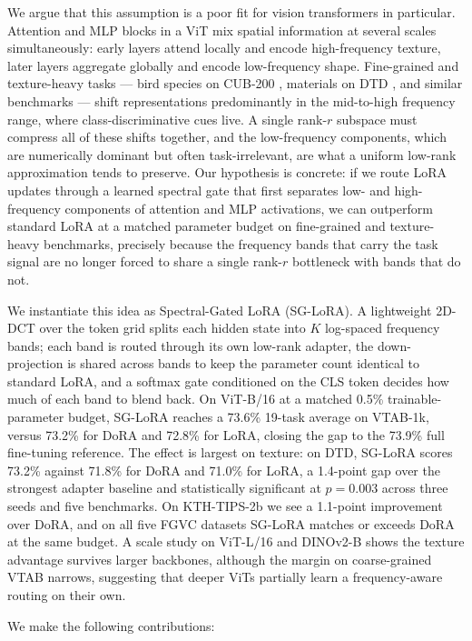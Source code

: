 \documentclass{article}
\begin{document}
We argue that this assumption is a poor fit for vision transformers in particular. Attention and MLP blocks in a ViT mix spatial information at several scales simultaneously: early layers attend locally and encode high-frequency texture, later layers aggregate globally and encode low-frequency shape. Fine-grained and texture-heavy tasks — bird species on CUB-200 \citep{wah2011cub}, materials on DTD \citep{cimpoi2014dtd}, and similar benchmarks — shift representations predominantly in the mid-to-high frequency range, where class-discriminative cues live. A single rank-$r$ subspace must compress all of these shifts together, and the low-frequency components, which are numerically dominant but often task-irrelevant, are what a uniform low-rank approximation tends to preserve. Our hypothesis is concrete: if we route LoRA updates through a learned spectral gate that first separates low- and high-frequency components of attention and MLP activations, we can outperform standard LoRA at a matched parameter budget on fine-grained and texture-heavy benchmarks, precisely because the frequency bands that carry the task signal are no longer forced to share a single rank-$r$ bottleneck with bands that do not.

We instantiate this idea as Spectral-Gated LoRA (SG-LoRA). A lightweight 2D-DCT over the token grid splits each hidden state into $K$ log-spaced frequency bands; each band is routed through its own low-rank adapter, the down-projection is shared across bands to keep the parameter count identical to standard LoRA, and a softmax gate conditioned on the CLS token decides how much of each band to blend back. On ViT-B/16 at a matched 0.5\% trainable-parameter budget, SG-LoRA reaches a 73.6\% 19-task average on VTAB-1k, versus 73.2\% for DoRA and 72.8\% for LoRA, closing the gap to the 73.9\% full fine-tuning reference. The effect is largest on texture: on DTD, SG-LoRA scores 73.2\% against 71.8\% for DoRA and 71.0\% for LoRA, a 1.4-point gap over the strongest adapter baseline and statistically significant at $p = 0.003$ across three seeds and five benchmarks. On KTH-TIPS-2b we see a 1.1-point improvement over DoRA, and on all five FGVC datasets SG-LoRA matches or exceeds DoRA at the same budget. A scale study on ViT-L/16 and DINOv2-B \citep{oquab2024dinov2} shows the texture advantage survives larger backbones, although the margin on coarse-grained VTAB narrows, suggesting that deeper ViTs partially learn a frequency-aware routing on their own.

We make the following contributions:
\end{document}
